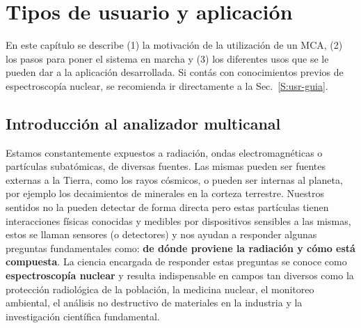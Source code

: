 \chapter{Tipos de usuario y aplicación}
\label{C:usuario}

\graphicspath{{figs/cap6/}{figs/comunes/}}

\begin{destacado}
En este capítulo se describe (1) la motivación de la utilización de un MCA, (2)
los pasos para poner el sistema en marcha y (3) los diferentes usos que se le
pueden dar a la aplicación desarrollada. Si contás con conocimientos previos de
espectroscopía nuclear, se recomienda ir directamente a la
Sec.~\ref{S:usr-guia}.
\end{destacado}

\section{Introducción al analizador multicanal}
\label{S:usr-mca}

Estamos constantemente expuestos a radiación, ondas electromagnéticas o
partículas subatómicas, de diversas fuentes. Las mismas pueden ser fuentes
externas a la Tierra, como los rayos cósmicos, o pueden ser internas al planeta,
por ejemplo los decaimientos de minerales en la corteza terrestre. Nuestros
sentidos no la pueden detectar de forma directa pero estas partículas tienen
interacciones físicas conocidas y medibles por dispositivos sensibles a las
mismas, estos se llaman sensores (o detectores) y nos ayudan a responder algunas
preguntas fundamentales como: \textbf{de dónde proviene la radiación y cómo está
compuesta}. La ciencia encargada de responder estas preguntas se conoce como
\textbf{espectroscopía nuclear} y resulta indispensable en campos tan diversos
como la protección radiológica de la población, la medicina nuclear, el
monitoreo ambiental, el análisis no destructivo de materiales en la industria y
la investigación científica fundamental.

